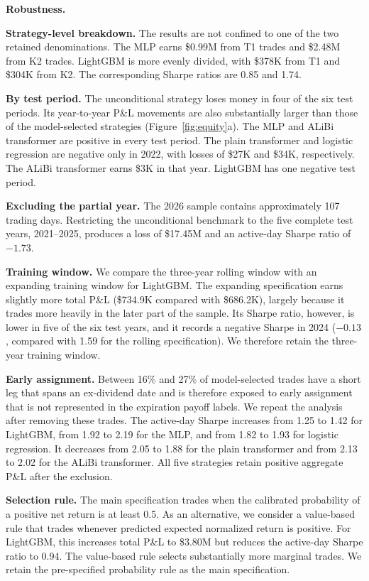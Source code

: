 \documentclass[sigconf,review,anonymous]{acmart}
\begin{document}
\smallskip\noindent\textbf{Robustness.}
\label{sec:robustness}

\noindent\textbf{Strategy-level breakdown.}
The results are not confined to one of the two retained denominations. The MLP earns \$0.99M from T1 trades and \$2.48M from K2 trades. LightGBM is more evenly divided, with \$378K from T1 and \$304K from K2. The corresponding Sharpe ratios are 0.85 and 1.74.

\noindent\textbf{By test period.}
The unconditional strategy loses money in four of the six test periods. Its year-to-year P\&L movements are also substantially larger than those of the model-selected strategies (Figure~\ref{fig:equity}a). The MLP and ALiBi transformer are positive in every test period. The plain transformer and logistic regression are negative only in 2022, with losses of \$27K and \$34K, respectively. The ALiBi transformer earns \$3K in that year. LightGBM has one negative test period.

\noindent\textbf{Excluding the partial year.}
The 2026 sample contains approximately 107 trading days. Restricting the unconditional benchmark to the five complete test years, 2021--2025, produces a loss of \$17.45M and an active-day Sharpe ratio of $-1.73$.

\noindent\textbf{Training window.}
We compare the three-year rolling window with an expanding training window for LightGBM. The expanding specification earns slightly more total P\&L (\$734.9K compared with \$686.2K), largely because it trades more heavily in the later part of the sample. Its Sharpe ratio, however, is lower in five of the six test years, and it records a negative Sharpe in 2024 ($-0.13$, compared with 1.59 for the rolling specification). We therefore retain the three-year training window.

\noindent\textbf{Early assignment.}
Between 16\% and 27\% of model-selected trades have a short leg that spans an ex-dividend date and is therefore exposed to early assignment that is not represented in the expiration payoff labels. We repeat the analysis after removing these trades. The active-day Sharpe increases from 1.25 to 1.42 for LightGBM, from 1.92 to 2.19 for the MLP, and from 1.82 to 1.93 for logistic regression. It decreases from 2.05 to 1.88 for the plain transformer and from 2.13 to 2.02 for the ALiBi transformer. All five strategies retain positive aggregate P\&L after the exclusion.

\noindent\textbf{Selection rule.}
The main specification trades when the calibrated probability of a positive net return is at least 0.5. As an alternative, we consider a value-based rule that trades whenever predicted expected normalized return is positive. For LightGBM, this increases total P\&L to \$3.80M but reduces the active-day Sharpe ratio to 0.94. The value-based rule selects substantially more marginal trades. We retain the pre-specified probability rule as the main specification.
\end{document}
